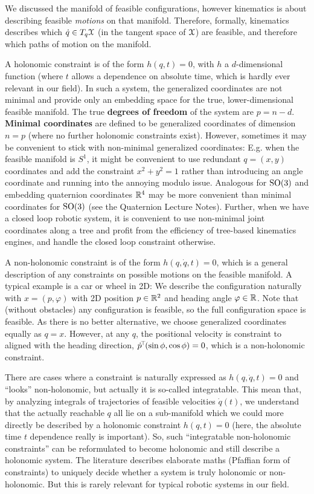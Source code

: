 We discussed the manifold of feasible
configurations, however kinematics is about describing feasible
\emph{motions} on that manifold. Therefore, formally, kinematics
describes which $\dot q \in T_q {\cal X}$ (in the tangent space of ${\cal X}$)
are feasible, and therefore which paths of motion on the manifold.

A holonomic constraint is of the form $h(q, t)=0$, with $h$ a
$d$-dimensional function (where $t$ allows a dependence on absolute
time, which is hardly ever relevant in our field). In such a system,
the generalized coordinates are not minimal and provide only an
embedding space for the true, lower-dimensional feasible manifold. The
true \textbf{degrees of freedom} of the system are
$p=n-d$. \textbf{Minimal coordinates} are defined to be generalized
coordinates of dimension $n=p$ (where no further holonomic constraints
exist). However, sometimes it may be convenient to stick with
non-minimal generalized coordinates: E.g. when the feasible manifold is
$S^1$, it might be convenient to use redundant $q=(x,y)$ coordinates
and add the constraint $x^2+y^2=1$ rather than introducing an angle
coordinate and running into the annoying modulo issue. Analogous for
$\text{SO}(3)$ and embedding quaternion coordinates ${\mathbb{R}}^4$ may be more
convenient than minimal coordinates for $\text{SO}(3)$ (see the Quaternion Lecture Notes). Further, when we
have a closed loop robotic system, it is convenient to use non-minimal
joint coordinates along a tree and profit from the efficiency of
tree-based kinematics engines, and handle the closed loop constraint
otherwise.

A non-holonomic constraint is of the form $h(q,\dot q,t)=0$, which is
a general description of any constraints on
possible motions on the feasible manifold. A typical example is a car
or wheel in 2D: We describe the configuration naturally with $x =
(p,\varphi)$ with 2D position $p\in{\mathbb{R}}^2$ and heading angle
$\varphi\in{\mathbb{R}}$. Note that (without obstacles) any configuration is
feasible, so the full configuration space is feasible. As there is no
better alternative, we choose generalized coordinates equally as $q =
x$. However, at any $q$, the positional velocity is constraint to
aligned with the heading direction, $\dot p^{\!\top\!} (\sin\phi, \cos\phi) = 0$,
which is a non-holonomic constraint.

There are cases where a constraint is naturally expressed as $h(q,\dot
q,t)=0$ and ``looks'' non-holonomic, but actually it is so-called
integratable. This mean that, by analyzing integrals of trajectories of
feasible velocities $\dot q(t)$, we understand that the actually
reachable $q$ all lie on a sub-manifold which we could more directly
be described by a holonomic constraint $h(q, t)=0$ (here, the absolute time
$t$ dependence really is important). So, such ``integratable
non-holonomic constraints'' can be reformulated to become holonomic
and still describe a holonomic system. The literature describes elaborate
maths (Pfaffian form of constraints) to uniquely decide whether a system is truly
holonomic or non-holonomic. But this is rarely relevant for typical
robotic systems in our field.

